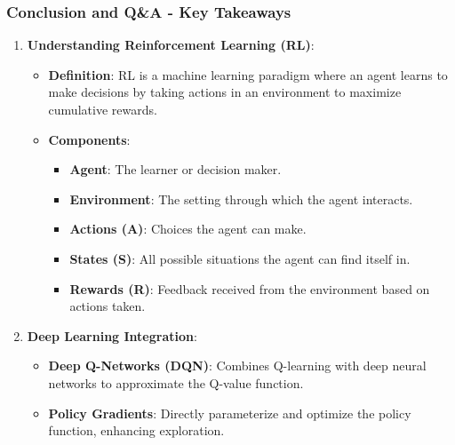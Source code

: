 \documentclass[aspectratio=169]{beamer}
\begin{document}
\begin{frame}[fragile]
    \frametitle{Conclusion and Q\&A - Key Takeaways}
    \begin{enumerate}
        \item \textbf{Understanding Reinforcement Learning (RL)}:
        \begin{itemize}
            \item \textbf{Definition}: RL is a machine learning paradigm where an agent learns to make decisions by taking actions in an environment to maximize cumulative rewards.
            \item \textbf{Components}:
            \begin{itemize}
                \item \textbf{Agent}: The learner or decision maker.
                \item \textbf{Environment}: The setting through which the agent interacts.
                \item \textbf{Actions (A)}: Choices the agent can make.
                \item \textbf{States (S)}: All possible situations the agent can find itself in.
                \item \textbf{Rewards (R)}: Feedback received from the environment based on actions taken.
            \end{itemize}
        \end{itemize}
        
        \item \textbf{Deep Learning Integration}:
        \begin{itemize}
            \item \textbf{Deep Q-Networks (DQN)}: Combines Q-learning with deep neural networks to approximate the Q-value function.
            \item \textbf{Policy Gradients}: Directly parameterize and optimize the policy function, enhancing exploration.
        \end{itemize}
    \end{enumerate}
\end{frame}
\end{document}
